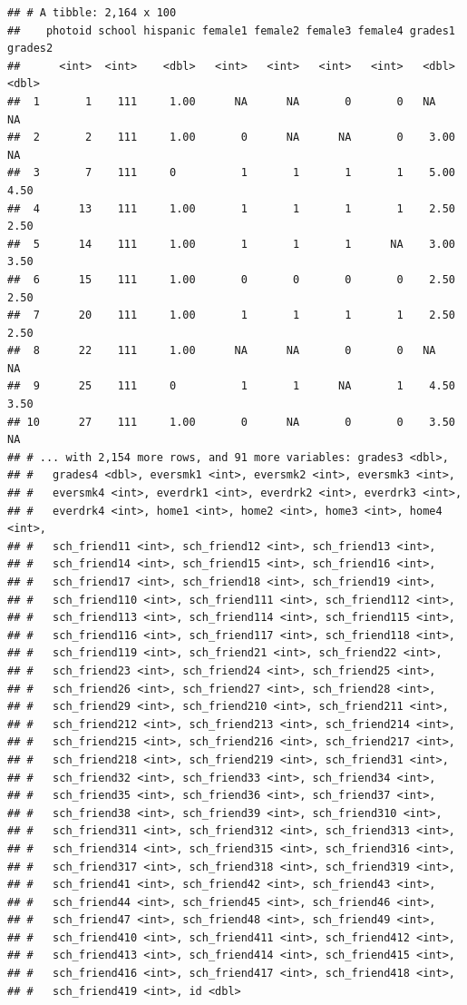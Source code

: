 \documentclass[]{book}
\theoremstyle{definition}
\theoremstyle{definition}
\theoremstyle{definition}
\theoremstyle{remark}
\begin{document}
\begin{verbatim}
## # A tibble: 2,164 x 100
##    photoid school hispanic female1 female2 female3 female4 grades1 grades2
##      <int>  <int>    <dbl>   <int>   <int>   <int>   <int>   <dbl>   <dbl>
##  1       1    111     1.00      NA      NA       0       0   NA      NA   
##  2       2    111     1.00       0      NA      NA       0    3.00   NA   
##  3       7    111     0          1       1       1       1    5.00    4.50
##  4      13    111     1.00       1       1       1       1    2.50    2.50
##  5      14    111     1.00       1       1       1      NA    3.00    3.50
##  6      15    111     1.00       0       0       0       0    2.50    2.50
##  7      20    111     1.00       1       1       1       1    2.50    2.50
##  8      22    111     1.00      NA      NA       0       0   NA      NA   
##  9      25    111     0          1       1      NA       1    4.50    3.50
## 10      27    111     1.00       0      NA       0       0    3.50   NA   
## # ... with 2,154 more rows, and 91 more variables: grades3 <dbl>,
## #   grades4 <dbl>, eversmk1 <int>, eversmk2 <int>, eversmk3 <int>,
## #   eversmk4 <int>, everdrk1 <int>, everdrk2 <int>, everdrk3 <int>,
## #   everdrk4 <int>, home1 <int>, home2 <int>, home3 <int>, home4 <int>,
## #   sch_friend11 <int>, sch_friend12 <int>, sch_friend13 <int>,
## #   sch_friend14 <int>, sch_friend15 <int>, sch_friend16 <int>,
## #   sch_friend17 <int>, sch_friend18 <int>, sch_friend19 <int>,
## #   sch_friend110 <int>, sch_friend111 <int>, sch_friend112 <int>,
## #   sch_friend113 <int>, sch_friend114 <int>, sch_friend115 <int>,
## #   sch_friend116 <int>, sch_friend117 <int>, sch_friend118 <int>,
## #   sch_friend119 <int>, sch_friend21 <int>, sch_friend22 <int>,
## #   sch_friend23 <int>, sch_friend24 <int>, sch_friend25 <int>,
## #   sch_friend26 <int>, sch_friend27 <int>, sch_friend28 <int>,
## #   sch_friend29 <int>, sch_friend210 <int>, sch_friend211 <int>,
## #   sch_friend212 <int>, sch_friend213 <int>, sch_friend214 <int>,
## #   sch_friend215 <int>, sch_friend216 <int>, sch_friend217 <int>,
## #   sch_friend218 <int>, sch_friend219 <int>, sch_friend31 <int>,
## #   sch_friend32 <int>, sch_friend33 <int>, sch_friend34 <int>,
## #   sch_friend35 <int>, sch_friend36 <int>, sch_friend37 <int>,
## #   sch_friend38 <int>, sch_friend39 <int>, sch_friend310 <int>,
## #   sch_friend311 <int>, sch_friend312 <int>, sch_friend313 <int>,
## #   sch_friend314 <int>, sch_friend315 <int>, sch_friend316 <int>,
## #   sch_friend317 <int>, sch_friend318 <int>, sch_friend319 <int>,
## #   sch_friend41 <int>, sch_friend42 <int>, sch_friend43 <int>,
## #   sch_friend44 <int>, sch_friend45 <int>, sch_friend46 <int>,
## #   sch_friend47 <int>, sch_friend48 <int>, sch_friend49 <int>,
## #   sch_friend410 <int>, sch_friend411 <int>, sch_friend412 <int>,
## #   sch_friend413 <int>, sch_friend414 <int>, sch_friend415 <int>,
## #   sch_friend416 <int>, sch_friend417 <int>, sch_friend418 <int>,
## #   sch_friend419 <int>, id <dbl>
\end{verbatim}
\end{document}
